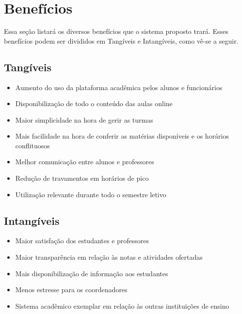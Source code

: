     \section{Benefícios}    %
    
        Essa seção listará os diversos benefícios que o sistema proposto trará. Esses benefícios podem ser divididos em Tangíveis e Intangíveis, como vê-se a seguir.
        
        \subsection{Tangíveis}
            \begin{itemize}
                \item Aumento do uso da plataforma acadêmica pelos alunos e funcionários
                \item Disponibilização de todo o conteúdo das aulas online
                \item Maior simplicidade na hora de gerir as turmas
                \item Mais facilidade na hora de conferir as matérias disponíveis e os horários conflituosos
                \item Melhor comunicação entre alunos e professores
                \item Redução de travamentos em horários de pico
                \item Utilização relevante durante todo o semestre letivo
            \end{itemize}
    
        \subsection{Intangíveis}
            \begin{itemize}
                \item Maior satisfação dos estudantes e professores
                \item Maior transparência em relação às notas e atividades ofertadas
                \item Mais disponibilização de informação aos estudantes
                \item Menos estresse para os coordenadores
                \item Sistema acadêmico exemplar em relação às outras instituições de ensino
            \end{itemize}
    
